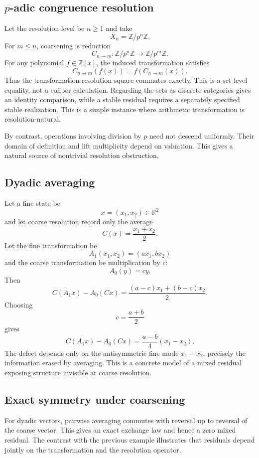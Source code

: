 \documentclass[11pt]{article}
\theoremstyle{definition}
\theoremstyle{remark}
\begin{document}
\subsection{\texorpdfstring{$p$}{p}-adic congruence resolution}

Let the resolution level be $n\ge1$ and take
\[
X_n=\mathbb Z/p^n\mathbb Z.
\]
For $m\le n$, coarsening is reduction
\[
C_{n\to m}:\mathbb Z/p^n\mathbb Z\to\mathbb Z/p^m\mathbb Z.
\]
For any polynomial $f\in\mathbb Z[x]$, the induced transformation satisfies
\[
C_{n\to m}(f(x))
=
f(C_{n\to m}(x)).
\]
Thus the transformation-resolution square commutes exactly. This is a set-level equality, not a cofiber calculation. Regarding the sets as discrete categories gives an identity comparison, while a stable residual requires a separately specified stable realization.
This is a simple instance where arithmetic transformation is resolution-natural.

By contrast, operations involving division by $p$ need not descend uniformly. Their domain of definition and lift multiplicity depend on valuation. This gives a natural source of nontrivial resolution obstruction.

\subsection{Dyadic averaging}

Let a fine state be
\[
x=(x_1,x_2)\in\mathbb R^2
\]
and let coarse resolution record only the average
\[
C(x)=\frac{x_1+x_2}{2}.
\]
Let the fine transformation be
\[
A_1(x_1,x_2)=(ax_1,bx_2)
\]
and the coarse transformation be multiplication by $c$:
\[
A_0(y)=cy.
\]
Then
\[
C(A_1x)-A_0(Cx)
=
\frac{(a-c)x_1+(b-c)x_2}{2}.
\]
Choosing
\[
c=\frac{a+b}{2}
\]
gives
\[
C(A_1x)-A_0(Cx)
=
\frac{a-b}{4}(x_1-x_2).
\]
The defect depends only on the antisymmetric fine mode $x_1-x_2$, precisely the information erased by averaging. This is a concrete model of a mixed residual exposing structure invisible at coarse resolution.

\subsection{Exact symmetry under coarsening}

For dyadic vectors, pairwise averaging commutes with reversal up to reversal of the coarse vector. This gives an exact exchange law and hence a zero mixed residual. The contrast with the previous example illustrates that residuals depend jointly on the transformation and the resolution operator.
\end{document}
